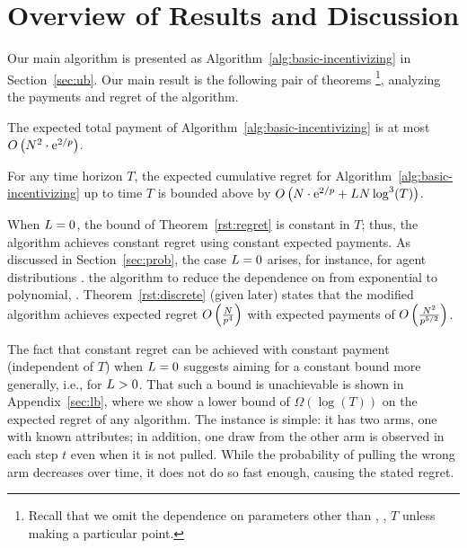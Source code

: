 \section{Overview of Results and Discussion}

Our main algorithm is presented as
Algorithm~\ref{alg:basic-incentivizing}
in Section~\ref{sec:ub}.
Our main result is the following pair of theorems%
\footnote{Recall that we omit the dependence on parameters other than
  \ARMNUM, \MinProb, $T$ unless making a particular point.},
analyzing the payments and regret of the algorithm.

\begin{theorem} \label{rst:budget}
The expected total payment of
Algorithm~\ref{alg:basic-incentivizing} is at most
$O \left(N^2 \cdot \mathrm{e}^{2/p} \right)$.
\end{theorem}

\begin{theorem} \label{rst:regret}
For any time horizon $T$, the expected cumulative regret for
Algorithm~\ref{alg:basic-incentivizing} up to time $T$ is bounded
above by 
$O \left(N \cdot \mathrm{e}^{2/p} + L N \log^3(T) \right)$.
\end{theorem}

When $L = 0$, the bound of Theorem~\ref{rst:regret} is
constant in $T$;
thus, the algorithm achieves constant regret using constant
expected payments. 
As discussed in Section~\ref{sec:prob},
the case $L = 0$ arises, for instance, for
 agent distributions .
 the algorithm to
reduce the dependence on \MinProb from exponential to polynomial,
.
Theorem~\ref{rst:discrete} (given later) states that the modified
algorithm achieves expected regret
$O \left(\frac{N}{p^4} \right)$
with expected payments of
$O \left(\frac{N^2}{p^{5/2}} \right)$.
  
The fact that constant regret can be achieved with constant payment
(independent of $T$) when $L = 0$ suggests aiming for a
constant bound more generally, i.e., for $L > 0$.
That such a bound is unachievable is shown in Appendix~\ref{sec:lb},
where we show a lower bound of $\Omega(\log(T))$ on
the expected regret of any algorithm.
The instance is simple: it has two arms, one with known attributes; 
in addition, one draw from the other arm is observed in
each step $t$ even when it is not pulled.
While the probability of pulling the wrong arm decreases over time, it
does not do so fast enough, causing the stated regret.

